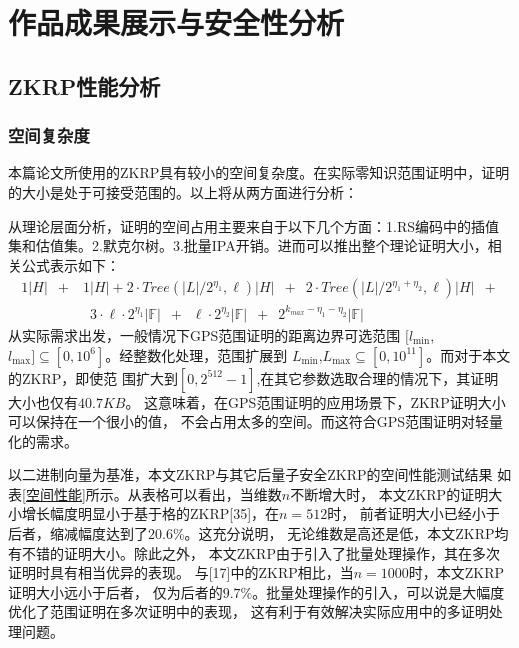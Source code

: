 \documentclass[zihao=-4]{ctexart}
\begin{document}
\section{作品成果展示与安全性分析}
\subsection{ZKRP性能分析}
\subsubsection{空间复杂度}
本篇论文所使用的ZKRP具有较小的空间复杂度。在实际零知识范围证明中，证明的大小是处于可接受范围的。以上将从两方面进行分析：\par
从理论层面分析，证明的空间占用主要来自于以下几个方面：1.RS编码中的插值集和估值集。2.默克尔树。3.批量IPA开销。进而可以推出整个理论证明大小，相关公式表示如下：
\begin{equation}
  \begin{aligned}
  1|H|\enspace+&1|H|+ 2\cdot Tree(|L|/2^{\eta_1}, \ell)|H|\enspace + \enspace2\cdot Tree(|L|/2^{\eta_1+\eta_2}, \ell)|H| \enspace+\\
  &\enspace3\cdot \ell \cdot 2^{\eta_1}|\mathbb{F}|\enspace +\enspace \ell \cdot 2^{\eta_2}|\mathbb{F}|\enspace + \enspace2^{k_{max}-\eta_1-\eta_2}|\mathbb{F}|
  \end{aligned}
\end{equation}
从实际需求出发，一般情况下GPS范围证明的距离边界可选范围
$[l_{\min}$,$l_{\max}]\subseteq[0, 10^6]$。经整数化处理，范围扩展到
$L_{\min}$,$L_{\max}\subseteq[0, 10^{11}]$。而对于本文的ZKRP，即使范
围扩大到$[0, 2^{512}-1]$,在其它参数选取合理的情况下，其证明大小也仅有$40.7KB$。
这意味着，在GPS范围证明的应用场景下，ZKRP证明大小可以保持在一个很小的值，
不会占用太多的空间。而这符合GPS范围证明对轻量化的需求。\par
以二进制向量为基准，本文ZKRP与其它后量子安全ZKRP的空间性能测试结果
如表\ref{空间性能}所示。从表格可以看出，当维数$n$不断增大时，
本文ZKRP的证明大小增长幅度明显小于基于格的ZKRP[35]，在$n=512$时，
前者证明大小已经小于后者，缩减幅度达到了$20.6 \% $。这充分说明，
无论维数是高还是低，本文ZKRP均有不错的证明大小。除此之外，
本文ZKRP由于引入了批量处理操作，其在多次证明时具有相当优异的表现。
与[17]中的ZKRP相比，当$n=1000$时，本文ZKRP证明大小远小于后者，
仅为后者的$9.7\%$。批量处理操作的引入，可以说是大幅度优化了范围证明在多次证明中的表现，
这有利于有效解决实际应用中的多证明处理问题。
\end{document}
